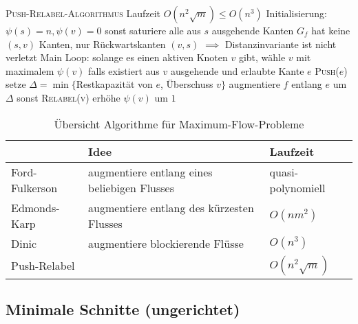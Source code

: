\begin{outline}
\1 \textsc{Push-Relabel-Algorithmus}
    \2 Laufzeit $O(n^2\sqrt{m})\leq O(n^3)$
    \2 Initialisierung:
        \3 $\psi(s)=n, \psi(v)=0$ sonst
        \3 saturiere alle aus $s$ ausgehende Kanten
        \3 $G_f$ hat keine $(s,v)$ Kanten, nur Rückwartskanten $(v,s)$
        $\implies$ Distanzinvariante ist nicht verletzt
    \2 Main Loop:
        \3 solange es einen aktiven Knoten $v$ gibt, wähle $v$ mit maximalem $\psi(v)$
        \3 falls existiert aus $v$ ausgehende und erlaubte Kante $e$ \textsc{Push($e$)}
            \4 setze $\Delta = \min \{ $Restkapazität von $e$, Überschuss $v\}$
            \4 augmentiere $f$ entlang $e$ um $\Delta$
        \3 sonst \textsc{Relabel(v)}
            \4 erhöhe $\psi(v)$ um $1$

\end{outline}

\begin{table}[h]
    \centering
    \begin{tabular}{m{2.5cm} m{5cm} m{2.5cm}}
        \toprule
         & Idee & Laufzeit  \\
         \midrule
         Ford-Fulkerson & augmentiere entlang eines beliebigen Flusses & quasi-polynomiell \\
         Edmonds-Karp & augmentiere entlang des kürzesten Flusses & $O(n m^2)$ \\
         Dinic & augmentiere blockierende Flüsse & $O(n^3)$\\
         Push-Relabel &  & $O(n^2\sqrt{m})$\\ 
         \bottomrule
    \end{tabular}
    \caption{Übersicht Algorithme für Maximum-Flow-Probleme}
\end{table}

\subsection{Minimale Schnitte (ungerichtet)}



